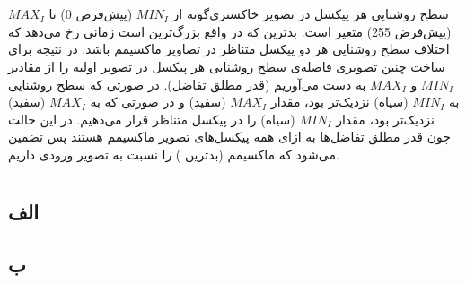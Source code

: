 \documentclass{article}
\begin{document}
\section{}%
سطح روشنایی هر پیکسل در تصویر خاکستری‌گونه از $MIN_{I}$ (پیش‌فرض 0) تا $MAX_{I}$ (پیش‌فرض 255) متغیر است. بدترین  که در واقع بزرگ‌ترین  است زمانی رخ می‌دهد که اختلاف سطح روشنایی هر دو پیکسل متناظر در تصاویر ماکسیمم باشد. در نتیجه برای ساخت چنین تصویری فاصله‌ی سطح روشنایی هر پیکسل در تصویر اولیه را از مقادیر $MIN_{I}$ و $MAX_{I}$ به دست می‌آوریم (قدر مطلق تفاضل). در صورتی که سطح روشنایی به $MIN_{I}$ (سیاه) نزدیک‌تر بود، مقدار $MAX_{I}$ (سفید) و در صورتی که به $MAX_{I}$ (سفید) نزدیک‌تر بود، مقدار $MIN_{I}$ (سیاه) را در پیکسل متناظر قرار می‌دهیم. در این حالت چون قدر مطلق تفاضل‌ها به ازای همه پیکسل‌های تصویر ماکسیمم هستند پس تضمین می‌شود که ماکسیمم (بدترین ) را نسبت به تصویر ورودی داریم.





\section{}%
\subsection{الف}
\begin{latin}

\end{latin}

\subsection{ب}
\begin{latin}

\end{latin}
\end{document}
